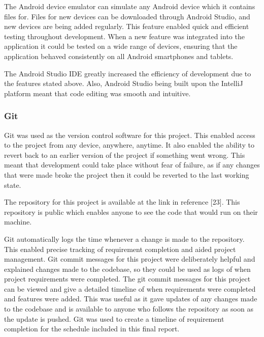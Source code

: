 \documentclass{article}
\begin{document}
The Android device emulator can simulate any Android device which it contains files for. Files for new devices can be downloaded through Android Studio, and new devices are being added regularly. This feature enabled quick and efficient testing throughout development. When a new feature was integrated into the application it could be tested on a wide range of devices, ensuring that the application behaved consistently on all Android smartphones and tablets. \par

The Android Studio IDE greatly increased the efficiency of development due to the features stated above. Also, Android Studio being built upon the IntelliJ platform meant that code editing was smooth and intuitive. \par

\subsubsection{Git}

Git was used as the version control software for this project. This enabled access to the project from any device, anywhere, anytime. It also enabled the ability to revert back to an earlier version of the project if something went wrong. This meant that development could take place without fear of failure, as if any changes that were made broke the project then it could be reverted to the last working state. \par

The repository for this project is available at the link in reference [23]. This repository is public which enables anyone to see the code that would run on their machine. \par

Git automatically logs the time whenever a change is made to the repository. This enabled precise tracking of requirement completion and aided project management. Git commit messages for this project were deliberately helpful and explained changes made to the codebase, so they could be used as logs of when project requirements were completed. The git commit messages for this project can be viewed and give a detailed timeline of when requirements were completed and features were added. This was useful as it gave updates of any changes made to the codebase and is available to anyone who follows the repository as soon as the update is pushed. Git was used to create a timeline of requirement completion for the schedule included in this final report. \par
\end{document}
